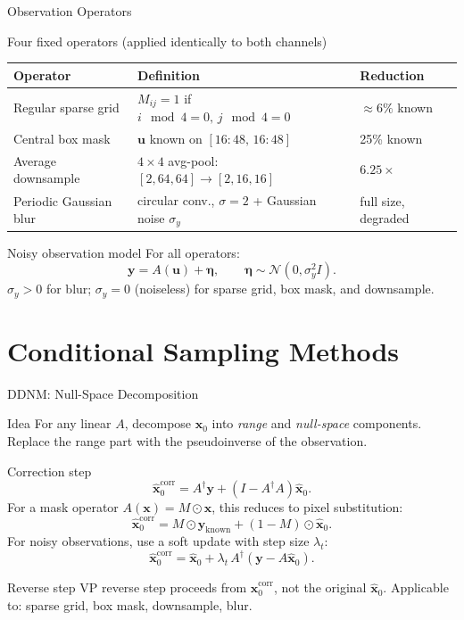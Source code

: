 \documentclass[9pt]{beamer}
\begin{document}
\begin{frame}{Observation Operators}
\begin{block}{Four fixed operators (applied identically to both channels)}
\renewcommand{\arraystretch}{1.3}
\begin{center}
\begin{tabular}{lll}
\toprule
\textbf{Operator} & \textbf{Definition} & \textbf{Reduction} \\
\midrule
Regular sparse grid & $M_{ij}=1$ if $i\!\mod 4=0,\, j\!\mod 4=0$ & $\approx6\%$ known \\
Central box mask & $\mathbf{u}$ known on $[16{:}48,\,16{:}48]$ & 25\% known \\
Average downsample & $4{\times}4$ avg-pool: $[2,64,64]\to[2,16,16]$ & $6.25\times$ \\
Periodic Gaussian blur & circular conv., $\sigma{=}2$ + Gaussian noise $\sigma_y$ & full size, degraded \\
\bottomrule
\end{tabular}
\end{center}
\end{block}
\begin{block}{Noisy observation model}
For all operators:
\[
  \mathbf{y} = A(\mathbf{u}) + \boldsymbol{\eta}, \qquad \boldsymbol{\eta} \sim \mathcal{N}(0, \sigma_y^2 I).
\]
$\sigma_y > 0$ for blur; $\sigma_y = 0$ (noiseless) for sparse grid, box mask, and downsample.
\end{block}
\end{frame}

\section{Conditional Sampling Methods}

\begin{frame}{DDNM: Null-Space Decomposition}
\begin{block}{Idea}
For any linear $A$, decompose $\hat{\mathbf{x}}_0$ into \emph{range} and \emph{null-space} components.
Replace the range part with the pseudoinverse of the observation.
\end{block}
\begin{block}{Correction step}
\[
  \hat{\mathbf{x}}_0^\text{corr} = A^\dagger \mathbf{y} + (I - A^\dagger A)\hat{\mathbf{x}}_0.
\]
For a mask operator $A(\mathbf{x}) = M \odot \mathbf{x}$, this reduces to pixel substitution:
\[
  \hat{\mathbf{x}}_0^\text{corr} = M \odot \mathbf{y}_\text{known} + (1-M)\odot\hat{\mathbf{x}}_0.
\]
For noisy observations, use a soft update with step size $\lambda_t$:
\[
  \hat{\mathbf{x}}_0^\text{corr} = \hat{\mathbf{x}}_0 + \lambda_t\,A^\dagger(\mathbf{y} - A\hat{\mathbf{x}}_0).
\]
\end{block}
\begin{block}{Reverse step}
VP reverse step proceeds from $\hat{\mathbf{x}}_0^\text{corr}$, not the original $\hat{\mathbf{x}}_0$.
Applicable to: sparse grid, box mask, downsample, blur.
\end{block}
\end{frame}
\end{document}
